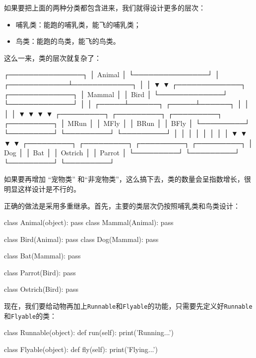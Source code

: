 如果要把上面的两种分类都包含进来，我们就得设计更多的层次：

\begin{itemize}
\item
  哺乳类：能跑的哺乳类，能飞的哺乳类；
\item
  鸟类：能跑的鸟类，能飞的鸟类。
\end{itemize}

这么一来，类的层次就复杂了：

\begin{pythoncode}
                ┌───────────────┐
                │    Animal     │
                └───────────────┘
                        │
           ┌────────────┴────────────┐
           │                         │
           ▼                         ▼
    ┌─────────────┐           ┌─────────────┐
    │   Mammal    │           │    Bird     │
    └─────────────┘           └─────────────┘
           │                         │
     ┌─────┴──────┐            ┌─────┴──────┐
     │            │            │            │
     ▼            ▼            ▼            ▼
┌─────────┐  ┌─────────┐  ┌─────────┐  ┌─────────┐
│  MRun   │  │  MFly   │  │  BRun   │  │  BFly   │
└─────────┘  └─────────┘  └─────────┘  └─────────┘
     │            │            │            │
     │            │            │            │
     ▼            ▼            ▼            ▼
┌─────────┐  ┌─────────┐  ┌─────────┐  ┌─────────┐
│   Dog   │  │   Bat   │  │ Ostrich │  │ Parrot  │
└─────────┘  └─────────┘  └─────────┘  └─────────┘
\end{pythoncode}

如果要再增加 ``宠物类''
和``非宠物类''，这么搞下去，类的数量会呈指数增长，很明显这样设计是不行的。

正确的做法是采用多重继承。首先，主要的类层次仍按照哺乳类和鸟类设计：

\begin{pythoncode}
class Animal(object):
    pass
class Mammal(Animal):
    pass

class Bird(Animal):
    pass
class Dog(Mammal):
    pass

class Bat(Mammal):
    pass

class Parrot(Bird):
    pass

class Ostrich(Bird):
    pass
\end{pythoncode}

现在，我们要给动物再加上\texttt{Runnable}和\texttt{Flyable}的功能，只需要先定义好\texttt{Runnable}和\texttt{Flyable}的类：

\begin{pythoncode}
class Runnable(object):
    def run(self):
        print('Running...')

class Flyable(object):
    def fly(self):
        print('Flying...')
\end{pythoncode}

